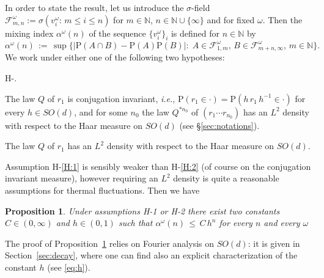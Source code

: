 \documentclass[a4paper,reqno,11pt]{amsart}
\numberwithin{equation}{section}
\newtheorem{proposition}[theorem]{Proposition}
\newcommand{\cF}{{\ensuremath{\mathcal F}} }
\newcommand{\ga}{\alpha}
\newcommand{\gs}{\sigma}
\newcommand{\go}{\omega}
\newcommand{\N}{\mathbb{N}}
\def\bP{\ensuremath{\bs{\mathrm{P}}}}
\def\bs{\boldsymbol}
\begin{document}
In order to state the result, let us introduce the
$\gs$-field $\cF_{m,n}^\go := \gs
(v_i^\go:\, m \le i \le n)$
for $m\in \N$, $n \in \N \cup \{\infty\}$ and for fixed $\go$. 
Then the mixing index $\ga^\go (n)$ of the sequence $\{ v_i^\go\}_i$
is defined for $n\in\N$ by
\begin{equation}
    \ga^\go (n) \, :=\, \sup \big\{ |\bP(A\cap B) - \bP(A)\bP(B)|:\;
    A \in \cF_{1,m}^\go, \, B\in\cF_{m+n,\infty}^\go,\, m \in \N \big\}.
\end{equation}
We work under either one of the following two hypotheses:

\smallskip
{}
\begin{list}{H-.}
   {
    }
\item  \label{H:1} The law $Q$ of $r_1$ is conjugation invariant,
{\sl i.e.}, $\bP(r_1 \in \cdot) = \bP(h\, r_1\, h^{-1} \in \cdot)$
for every $h \in SO(d)$,
and for some $n_0$ the law $Q^{*n_0}$
of $(r_1 \cdots r_{n_0})$ has an $L^2$ density with respect to the Haar measure
on $SO(d)$ (see \S\ref{sec:notations}).

\item \label{H:2}\rule{0pt}{1.2em}The law $Q$ of $r_1$ 
has an $L^2$ density with respect to the Haar measure on $SO(d)$.
\end{list}
\smallskip

\noindent
Assumption H-\ref{H:1} is sensibly weaker than  H-\ref{H:2}
(of course on the conjugation invariant measure),
however requiring an $L^2$ density is  quite a reasonable assumptions for thermal fluctuations.
Then we have

\medskip
\begin{proposition}
\label{th:mixing}
Under assumptions H-1 or H-2
there exist two constants
$C \in (0,\infty)$ and  $h \in (0,1)$ such that   
$\alpha^\go (n) \, \le \,  C\,  h^{n}$ for every $n$ and every $\go$
\end{proposition}
\medskip

The proof of  
Proposition~\ref{th:mixing} relies on Fourier analysis on $SO(d)$: it is given in
Section~\ref{sec:decay}, where one can find also an explicit characterization of the constant $ h$
(see \eqref{eq:h}).





\medskip
\end{document}
